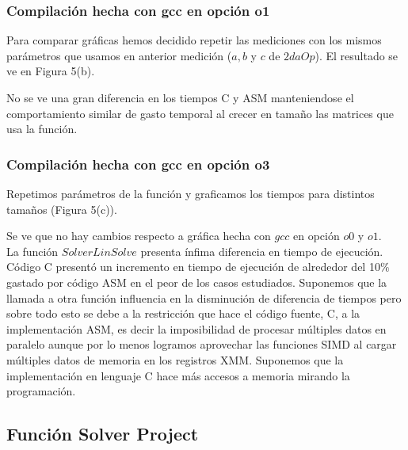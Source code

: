 \subsubsection{Compilación hecha con gcc en opción o1}
Para comparar gráficas hemos decidido repetir las mediciones con los mismos parámetros que usamos en anterior medición ($a, b$ y $c$ de $2daOp$). El resultado se ve en Figura 5(b).
 
No se ve una gran diferencia en los tiempos C y ASM manteniendose el comportamiento similar de gasto temporal al crecer en tamaño las matrices que usa la función.
  
\subsubsection{Compilación hecha con gcc en opción o3}
Repetimos parámetros de la función y graficamos los tiempos para distintos tamaños (Figura 5(c)).
 
Se ve que no hay cambios respecto a gráfica hecha con $gcc$ en opción $o0$ y $o1$. \\

La función $Solver Lin Solve$ presenta ínfima diferencia en tiempo de ejecución. Código C presentó un incremento en tiempo de ejecución de alrededor del 10$\%$ gastado por código ASM en el peor de los casos estudiados. Suponemos que la llamada a otra función influencia en la disminución de diferencia de tiempos pero sobre todo esto se debe a la restricción que hace el código fuente, C, a la implementación ASM, es decir la imposibilidad de procesar múltiples datos en paralelo aunque por lo menos logramos aprovechar las funciones SIMD al cargar múltiples datos de memoria en los registros XMM. Suponemos que la implementación en lenguaje C hace más accesos a memoria mirando la programación.

 
\subsection{Función Solver Project}

